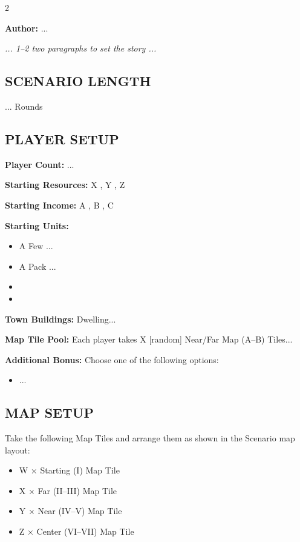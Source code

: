 
\begin{multicols*}{2}

\textbf{Author:} ...

\textit{... 1--2 two paragraphs to set the story ...}

\subsection*{\MakeUppercase{Scenario Length}}

... Rounds

\subsection*{\MakeUppercase{Player Setup}}

\textbf{Player Count:} ...

\textbf{Starting Resources:} X , Y , Z 

\textbf{Starting Income:} A , B , C 

\textbf{Starting Units:}
\begin{itemize}
  \item A Few ...
  \item A Pack ...
  \item {}
  \item {}
\end{itemize}

\textbf{Town Buildings:}  Dwelling...

\textbf{Map Tile Pool:} Each player takes X [random] Near/Far Map (A--B) Tiles...

\textbf{Additional Bonus:} Choose one of the following options:

\begin{itemize}
    \item ...
\end{itemize}

\subsection*{\MakeUppercase{Map Setup}}

Take the following Map Tiles and arrange them as shown in the Scenario map layout:
\begin{itemize}
  \item W × Starting (I) Map Tile
  \item X × Far (II--III) Map Tile
  \item Y × Near (IV--V) Map Tile
  \item Z × Center (VI--VII) Map Tile
\end{itemize}


\end{multicols*}
